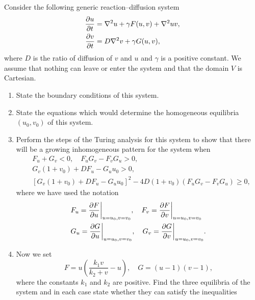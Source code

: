 \documentclass[a4paper, 12pt]{article}
\begin{document}
\begin{enumerate}[label={\bf \arabic{*}.\;}, ref={\arabic{*}},itemsep=3ex, left=0ex]
{      }


      {
        Consider the following generic  reaction--diffusion system
        \begin{align*}
          \pd{u}{t} &= \nabla^2 u + \gamma F(u,v) + \nabla^2{uv},\\
          \pd{v}{t} &= D\nabla^2 v + \gamma G(u,v),
        \end{align*}
        where $D$ is the ratio of diffusion of $v$ and $u$ and $\gamma$ is a positive constant. We assume that nothing can leave or enter the system and that the domain $V$ is Cartesian.
        \begin{enumerate}[label=(\alph*)]
          \item{State the boundary conditions of this system.}
          \item{State the equations which would determine the homogeneous equilibria $(u_0,v_0)$ of this system.
            }
          \item{Perform the steps of the Turing analysis for this system to show that there will be a growing inhomogeneous pattern for the system when
              \begin{align*}
                &F_u + G_v <0, \quad F_u G_v - F_vG_u >0,\\
                &G_v(1+v_0) + D F_u - G_u u_0 >0,\\
                &\left[G_v(1+v_0) + D F_u - G_u u_0\right]^2 - 4 D(1+v_0)(F_u G_v - F_vG_u) \geq 0,
              \end{align*}
              where we have used the notation
              \begin{align*}
                &F_{u} = \pd{F}{u}\bigg\vert_{u=u_0,v=v_0},\quad F_{v} = \pd{F}{v}\bigg\vert_{u=u_0,v=v_0}\\
                &G_{u} = \pd{G}{u}\bigg\vert_{u=u_0,v=v_0},\quad G_{v} = \pd{G}{v}\bigg\vert_{u=u_0,v=v_0}.
              \end{align*}
            }
          \item{
              Now we set
              \begin{equation}
                F  = u\left(\frac{k_1 v}{k_2+v}-u\right),\quad G = (u-1)(v-1),
              \end{equation}
              where the constants $k_1$ and $k_2$ are positive. Find the three equilibria of the system and in each case state whether they can satisfy the inequalities
}
\end{enumerate}}
\end{enumerate}
\end{document}
